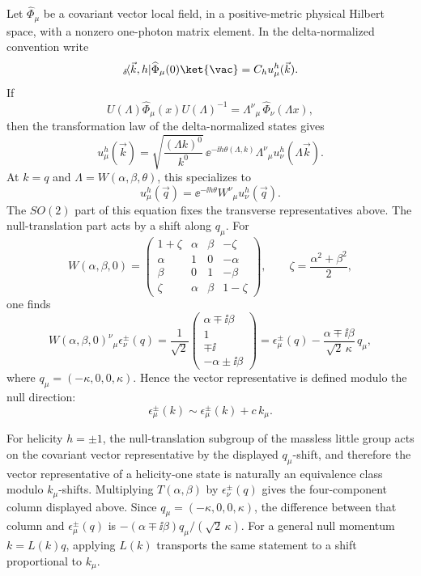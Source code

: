 Let \(\widehat\Phi_\mu\) be a covariant vector local field, in a
positive-metric physical Hilbert space, with a nonzero one-photon matrix
element. In the delta-normalized convention write
\[
  {}_\delta\!\langle \vec k,h|\widehat\Phi_\mu(0)\ket{\vac}
  =
  C_h u_\mu^h(\vec k).
\]
If
\[
  U(\Lambda)\widehat\Phi_\mu(x)U(\Lambda)^{-1}
  =
  \Lambda^\nu{}_\mu\,\widehat\Phi_\nu(\Lambda x),
\]
then the transformation law of the delta-normalized states gives
\[
  u_\mu^h(\vec k)
  =
  \sqrt{\frac{(\Lambda k)^0}{k^0}}\,
  \ee^{-\ii h\theta(\Lambda,k)}
  \Lambda^\nu{}_\mu u_\nu^h(\Lambda\vec k).
\]
At \(k=q\) and \(\Lambda=W(\alpha,\beta,\theta)\), this specializes to
\[
  u_\mu^h(\vec q)
  =
  \ee^{-\ii h\theta}
  W^\nu{}_\mu u_\nu^h(\vec q).
\]
The \(SO(2)\) part of this equation fixes the transverse representatives
above. The null-translation part acts by a shift along \(q_\mu\).
For
\[
  W(\alpha,\beta,0)
  =
  \begin{pmatrix}
    1+\zeta&\alpha&\beta&-\zeta\\
    \alpha&1&0&-\alpha\\
    \beta&0&1&-\beta\\
    \zeta&\alpha&\beta&1-\zeta
  \end{pmatrix},
  \qquad
  \zeta=\frac{\alpha^2+\beta^2}{2},
\]
one finds
\[
  W(\alpha,\beta,0)^\nu{}_\mu\epsilon_\nu^\pm(q)
  =
  \frac{1}{\sqrt2}
  \begin{pmatrix}
    \alpha\mp\ii\beta\\
    1\\
    \mp\ii\\
    -\alpha\pm\ii\beta
  \end{pmatrix}
  =
  \epsilon_\mu^\pm(q)
  -
  \frac{\alpha\mp\ii\beta}{\sqrt2\,\kappa}\,q_\mu ,
\]
where \(q_\mu=(-\kappa,0,0,\kappa)\). Hence the vector representative is
defined modulo the null direction:
\[
  \epsilon_\mu^\pm(k)\sim \epsilon_\mu^\pm(k)+c\,k_\mu .
\]

For helicity \(h=\pm1\), the null-translation subgroup of the massless little
group acts on the covariant vector representative by the displayed
\(q_\mu\)-shift, and therefore the vector representative of a helicity-one
state is naturally an equivalence class modulo \(k_\mu\)-shifts.
Multiplying \(T(\alpha,\beta)\) by \(\epsilon_\nu^\pm(q)\) gives the
four-component column displayed above.  Since
\(q_\mu=(-\kappa,0,0,\kappa)\), the difference between that column and
\(\epsilon_\mu^\pm(q)\) is
\(-(\alpha\mp\ii\beta)q_\mu/(\sqrt2\,\kappa)\).  For a general null momentum
\(k=L(k)q\), applying \(L(k)\) transports the same statement to a shift
proportional to \(k_\mu\).

